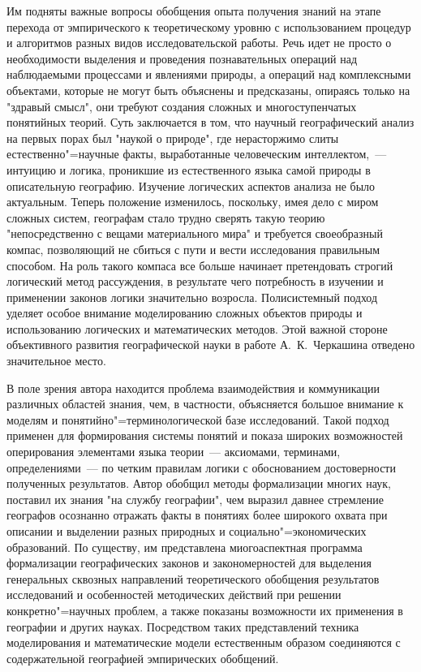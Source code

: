\documentclass[14pt,draft,openany]{extbook}
\begin{document}
Им подняты важные вопросы обобщения опыта получения знаний на этапе перехода от эмпирического к теоретическому уровню с использованием процедур и алгоритмов разных видов исследовательской работы. Речь идет не просто о необходимости выделения и проведения познавательных операций над наблюдаемыми процессами и явлениями природы, а операций над комплексными объектами, которые не могут быть объяснены и предсказаны, опираясь только на "здравый смысл", они требуют создания сложных и многоступенчатых понятийных теорий. Суть заключается в том, что научный географический анализ на первых порах был "наукой о природе", где нерасторжимо слиты естественно"=научные факты, выработанные человеческим интеллектом,~--- интуицию и логика, проникшие из естественного языка самой природы в описательную географию. Изучение логических аспектов анализа не было актуальным. Теперь положение изменилось, поскольку, имея дело с миром сложных систем, географам стало трудно сверять такую теорию "непосредственно с вещами материального мира" и требуется своеобразный компас, позволяющий не сбиться с пути и вести исследования правильным способом. На роль такого компаса все больше начинает претендовать строгий логический метод рассуждения, в результате чего потребность в изучении и применении законов логики значительно возросла. Полисистемный подход уделяет особое внимание моделированию сложных объектов природы и использованию логических и математических методов. Этой важной стороне объективного развития географической науки в работе А.~К.~Черкашина отведено значительное место.

В поле зрения автора находится проблема взаимодействия и коммуникации различных областей знания, чем, в частности, объясняется большое внимание к моделям и понятийно"=терминологической базе исследований. Такой подход применен для формирования системы понятий и показа широких возможностей оперирования элементами языка теории~--- аксиомами, терминами, определениями~--- по четким правилам логики с обоснованием достоверности полученных результатов. Автор обобщил методы формализации многих наук, поставил их знания "на службу географии", чем выразил давнее стремление географов осознанно отражать факты в понятиях более широкого охвата при описании и выделении разных природных и социально"=экономических образований. По существу, им представлена миогоаспектная программа формализации географических законов и закономерностей для выделения генеральных сквозных направлений теоретического обобщения результатов исследований и особенностей методических действий при решении конкретно"=научных проблем, а также показаны возможности их применения в географии и других науках. Посредством таких представлений техника моделирования и математические модели естественным образом соединяются с содержательной географией эмпирических обобщений.
\end{document}
